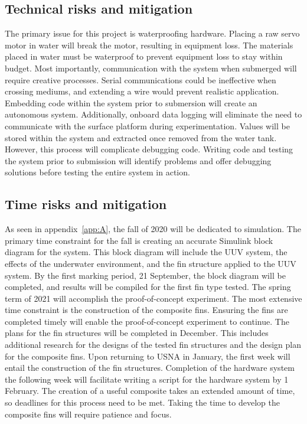 \documentclass[]{IEEEtran}
\begin{document}
\subsection{Technical risks and mitigation}
The primary issue for this project is waterproofing hardware.  Placing a raw servo motor in water will break the motor, resulting in equipment loss.  The materials placed in water must be waterproof to prevent equipment loss to stay within budget.  Most importantly, communication with the system when submerged will require creative processes.  Serial communications could be ineffective when crossing mediums, and extending a wire would prevent realistic application.  Embedding code within the system prior to submersion will create an autonomous system.  Additionally, onboard data logging will eliminate the need to communicate with the surface platform during experimentation.  Values will be stored within the system and extracted once removed from the water tank.  However, this process will complicate debugging code.  Writing code and testing the system prior to submission will identify problems and offer debugging solutions before testing the entire system in action.  

\subsection{Time risks and mitigation}
As seen in appendix~\ref{app:A}, the fall of 2020 will be dedicated to simulation.  The primary time constraint for the fall is creating an accurate Simulink block diagram for the system.  This block diagram will include the UUV system, the effects of the underwater environment, and the fin structure applied to the UUV system.  By the first marking period, 21 September, the block diagram will be completed, and results will be compiled for the first fin type tested.  The spring term of 2021 will accomplish the proof-of-concept experiment.  The most extensive time constraint is the construction of the composite fins.  Ensuring the fins are completed timely will enable the proof-of-concept experiment to continue.  The plans for the fin structures will be completed in December.  This includes additional research for the designs of the tested fin structures and the design plan for the composite fins.  Upon returning to USNA in January, the first week will entail the construction of the fin structures.  Completion of the hardware system the following week will facilitate writing a script for the hardware system by 1 February.  The creation of a useful composite takes an extended amount of time, so deadlines for this process need to be met.  Taking the time to develop the composite fins will require patience and focus.  
\end{document}
